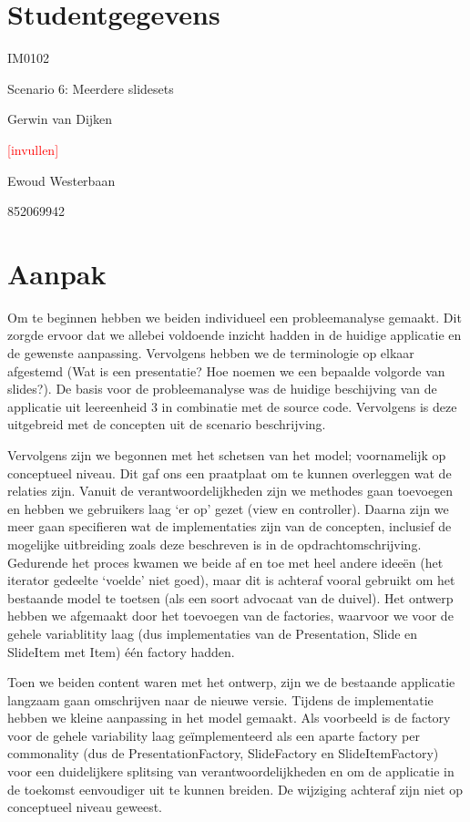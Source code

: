 \documentclass[a4paper]{article}
\newcommand{\todo}[1]{\textcolor{red}{[#1]}}
\begin{document}
\pagestyle{fancy}

\section*{Studentgegevens}
\begin{description}
	\item [Cursuscode] IM0102
	\item Scenario 6: Meerdere slidesets
	\item [Naam] Gerwin van Dijken
	\item [Studentnummer] \todo{invullen}
	\item [Naam] Ewoud Westerbaan
	\item [Studentnummer] 852069942
\end{description}

\section*{Aanpak}
Om te beginnen hebben we beiden individueel een probleemanalyse gemaakt. Dit zorgde ervoor dat we allebei voldoende inzicht hadden in de huidige applicatie en de gewenste aanpassing. Vervolgens hebben we de terminologie op elkaar afgestemd (Wat is een presentatie? Hoe noemen we een bepaalde volgorde van slides?). De basis voor de probleemanalyse was de huidige beschijving van de applicatie uit leereenheid 3 in combinatie met de source code. Vervolgens is deze uitgebreid met de concepten uit de scenario beschrijving.
\par
Vervolgens zijn we begonnen met het schetsen van het model; voornamelijk op conceptueel niveau. Dit gaf ons een praatplaat om te kunnen overleggen wat de relaties zijn. Vanuit de verantwoordelijkheden zijn we methodes gaan toevoegen en hebben we  gebruikers laag `er op' gezet (view en controller). Daarna zijn we meer gaan specifieren wat de implementaties zijn van de concepten, inclusief de mogelijke uitbreiding zoals deze beschreven is in de opdrachtomschrijving. Gedurende het proces kwamen we beide af en toe met heel andere ideeën (het iterator gedeelte `voelde' niet goed), maar dit is achteraf vooral gebruikt om het bestaande model te toetsen (als een soort advocaat van de duivel). Het ontwerp hebben we afgemaakt door het toevoegen van de factories, waarvoor we voor de gehele variablitity laag (dus implementaties van de Presentation, Slide en SlideItem met Item) één factory hadden. 
\par
Toen we beiden content waren met het ontwerp, zijn we de bestaande applicatie langzaam gaan omschrijven naar de nieuwe versie. Tijdens de implementatie hebben we kleine aanpassing in het model gemaakt. Als voorbeeld is de factory voor de gehele variability laag geïmplementeerd als een aparte factory per commonality (dus de PresentationFactory, SlideFactory en SlideItemFactory) voor een duidelijkere splitsing van verantwoordelijkheden en om de applicatie in de toekomst eenvoudiger uit te kunnen breiden. De wijziging achteraf zijn niet op conceptueel niveau geweest.
\end{document}
